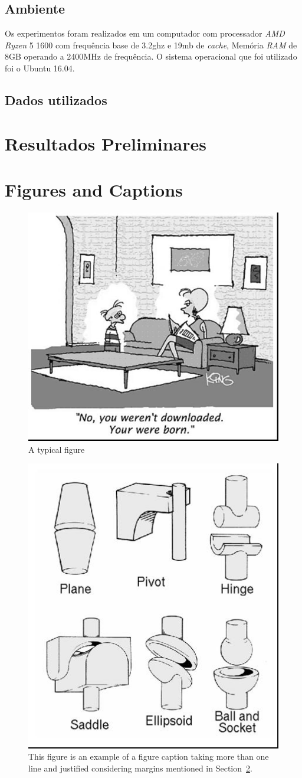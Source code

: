 \documentclass[12pt]{article}
\begin{document}
\subsection{Ambiente}
Os experimentos foram realizados em um computador com processador \textit{AMD Ryzen} 5 1600 com frequência base de 3.2ghz e 19mb de \textit{cache}, Memória \textit{RAM} de 8GB operando a 2400MHz de frequência. O sistema operacional que foi utilizado foi o Ubuntu 16.04.
\subsection{Dados utilizados}



\section{Resultados Preliminares}


\section{Figures and Captions}\label{sec:figs}


\begin{figure}[ht]
\centering
\includegraphics[width=.5\textwidth]{fig1.jpg}
\caption{A typical figure}
\label{fig:exampleFig1}
\end{figure}

\begin{figure}[ht]
\centering
\includegraphics[width=.3\textwidth]{fig2.jpg}
\caption{This figure is an example of a figure caption taking more than one
  line and justified considering margins mentioned in Section~\ref{sec:figs}.}
\label{fig:exampleFig2}
\end{figure}
\end{document}

